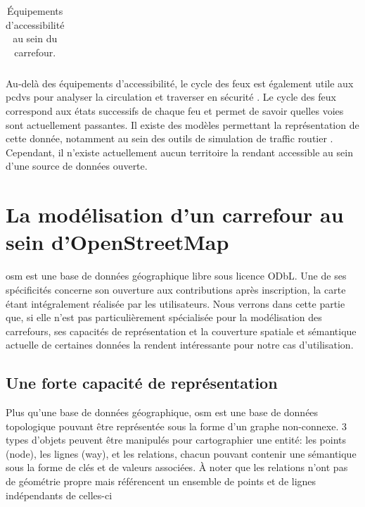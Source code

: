 \begin{table}[ht]
\begin{center}
\begin{tabular}{ | m{2cm} | m{10cm} }
    \end{tabular}
    \end{center}
    \caption[Équipements d'accessibilité d'un carrefour]{Équipements d'accessibilité au sein du carrefour.}
    \label{tab:modelisation_objets}
\end{table}

Au-delà des équipements d'accessibilité, le cycle des feux est également utile aux \glspl{pcdv} pour analyser la circulation et traverser en sécurité \citep{ratelle_manuel_2019}. Le cycle des feux correspond aux états successifs de chaque feu et permet de savoir quelles voies sont actuellement passantes. Il existe des modèles permettant la représentation de cette donnée, notamment au sein des outils de simulation de traffic routier \citep{Lopez2018}. Cependant, il n'existe actuellement aucun territoire la rendant accessible au sein d'une source de données ouverte.

\section{La modélisation d’un carrefour au sein d’OpenStreetMap}

\label{sec:modelisation_osm}


\gls{osm} est une base de données géographique libre sous licence ODbL. Une de ses spécificités concerne son ouverture aux contributions après inscription, la carte étant intégralement réalisée par les utilisateurs. Nous verrons dans cette partie que, si elle n'est pas particulièrement spécialisée pour la modélisation des carrefours, ses capacités de représentation et la couverture spatiale et sémantique actuelle de certaines données la rendent intéressante pour notre cas d'utilisation.

\subsection{Une forte capacité de représentation}

Plus qu'une base de données géographique, \gls{osm} est une base de données topologique pouvant être représentée sous la forme d'un graphe non-connexe. 3 types d'objets peuvent être manipulés pour cartographier une entité: les points (node), les lignes (way), et les relations, chacun pouvant contenir une sémantique sous la forme de clés et de valeurs associées. À noter que les relations n'ont pas de géométrie propre mais référencent un ensemble de points et de lignes indépendants de celles-ci

